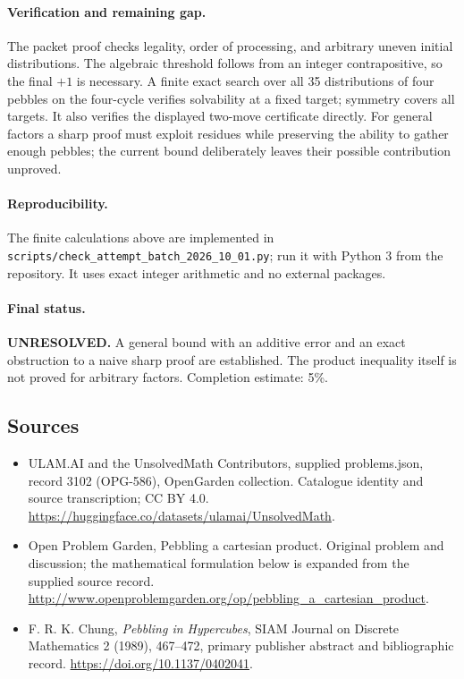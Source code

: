 \documentclass[11pt,a4paper]{article}
\begin{document}
\paragraph{Verification and remaining gap.}
The packet proof checks legality, order of processing, and arbitrary uneven
initial distributions. The algebraic threshold follows from an integer
contrapositive, so the final $+1$ is necessary. A finite exact search over
all 35 distributions of four pebbles on the four-cycle verifies solvability
at a fixed target; symmetry covers all targets. It also verifies the displayed
two-move certificate directly. For general factors a sharp proof must exploit
residues while preserving the ability to gather enough pebbles; the current
bound deliberately leaves their possible contribution unproved.

\paragraph{Reproducibility.}
The finite calculations above are implemented in
\texttt{scripts/check\_attempt\_batch\_2026\_10\_01.py}; run it with Python 3
from the repository. It uses exact integer arithmetic and no external packages.

\paragraph{Final status.}
\textbf{UNRESOLVED.} A general bound with an additive error and an exact
obstruction to a naive sharp proof are established. The product inequality
itself is not proved for arbitrary factors. Completion estimate: 5\%.

\subsection{Sources}
\begin{itemize}
\item[S1] ULAM.AI and the UnsolvedMath Contributors, supplied problems.json, record 3102 (OPG-586), OpenGarden collection. Catalogue identity and source transcription; CC BY 4.0.
\url{https://huggingface.co/datasets/ulamai/UnsolvedMath}.
\item[S2] Open Problem Garden, Pebbling a cartesian product. Original problem and discussion; the mathematical formulation below is expanded from the supplied source record.
\url{http://www.openproblemgarden.org/op/pebbling_a_cartesian_product}.
\item[A1] F. R. K. Chung, \emph{Pebbling in Hypercubes}, SIAM Journal on Discrete Mathematics 2 (1989), 467--472, primary publisher abstract and bibliographic record. \url{https://doi.org/10.1137/0402041}.
\end{itemize}
\end{document}
